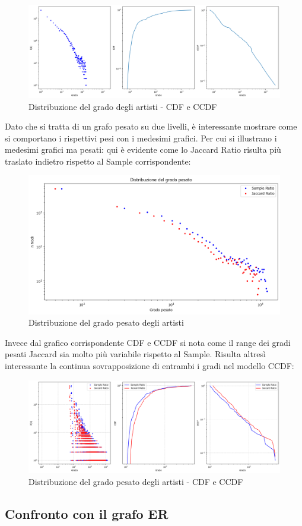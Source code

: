 \documentclass[sigchi]{acmart}
\begin{document}
\begin{figure}[H]
\centering
\includegraphics[width=0.45
\textwidth]{../network_analysis/plots/2_2/plotDist.png}
\caption{Distribuzione del grado degli artisti - CDF e CCDF}
\label{fig:plotDist}
\end{figure}

Dato che si tratta di un grafo pesato su due livelli, è interessante mostrare come si comportano i rispettivi pesi con i medesimi grafici. Per cui si illustrano i medesimi grafici ma pesati: qui è evidente come lo Jaccard Ratio risulta più traslato indietro rispetto al Sample corrispondente:

\begin{figure}[H]
\centering
\includegraphics[width=0.45
\textwidth]{../network_analysis/plots/2_2/wGhGrDist.png}
\caption{Distribuzione del grado pesato degli artisti}
\label{fig:plotDist}
\end{figure}

Invece dal grafico corrispondente CDF e CCDF si nota come il range dei gradi pesati Jaccard sia molto più variabile rispetto al Sample. Risulta altresì interessante la continua sovrapposizione di entrambi i gradi nel modello CCDF:

\begin{figure}[H]
\centering
\includegraphics[width=0.45
\textwidth]{../network_analysis/plots/2_2/wPlotDist.png}
\caption{Distribuzione del grado pesato degli artisti - CDF e CCDF}
\label{fig:plotDist}
\end{figure}


\subsection{Confronto con il grafo ER}
\end{document}
